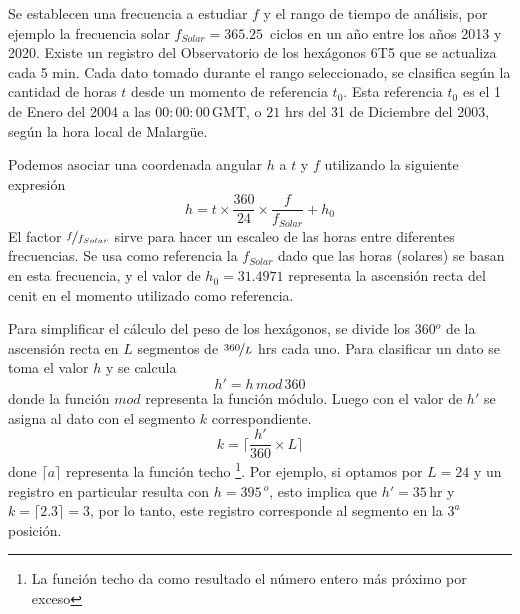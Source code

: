         Se establecen una frecuencia a estudiar $f$ y el rango de tiempo de análisis, por ejemplo la frecuencia solar $f_{Solar}= 365.25\,$ ciclos en un año entre los años 2013 y 2020. Existe un registro del Observatorio de los hexágonos 6T5 que se actualiza cada 5 min. Cada dato tomado durante el rango seleccionado, se clasifica según la cantidad de horas $t$ desde un momento de referencia $t_0$. Esta referencia $t_0$ es el 1 de Enero del 2004 a las $00:00:00\,$GMT, o  $21$ hrs del 31 de Diciembre del 2003, según la hora local de Malargüe.

        Podemos asociar una coordenada angular $h$   a $t$  y $f$  utilizando la siguiente expresión
         \begin{equation}
          h = t \times \frac{360}{24} \times\frac{f}{f_{Solar}} + h_0
          \label{eq:h_horas} 
        \end{equation}
        El factor $\nicefrac{f}{f_{Solar}}$ sirve para hacer un escaleo de las horas entre diferentes frecuencias. Se usa como referencia la $f_{Solar}$ dado que las horas (solares) se basan en esta frecuencia, y el valor de $h_0=31.4971$ representa la ascensión recta del cenit en el momento utilizado como referencia.
        
        Para simplificar el cálculo del peso de los hexágonos, se divide los 360$^o$ de la ascensión recta en $L$ segmentos de $\nicefrac{360}{L}$ hrs cada uno. Para clasificar un dato se  toma  el valor $h$  y se calcula
        \begin{equation}
          h' = h\, mod \,360 
          \label{eq:h_primado}
        \end{equation}
        donde la función $mod$ representa la función módulo. Luego con el valor de $h'$ se asigna al dato con el segmento $k$ correspondiente.
        \begin{equation}
          k = \bigg \lceil \frac{h'}{360}\times L \bigg \rceil
        \end{equation}
        done $\lceil a \rceil$ representa la función techo \footnote{La función techo da como resultado el número entero más próximo por exceso}. Por ejemplo, si optamos por $L=24$ y un registro en particular resulta con  $h=395\,^o$, esto implica que $h'= 35\,$hr y $k=\lceil 2.3 \rceil=3$, por lo tanto, este registro corresponde al segmento en la $3^{a}$ posición.

